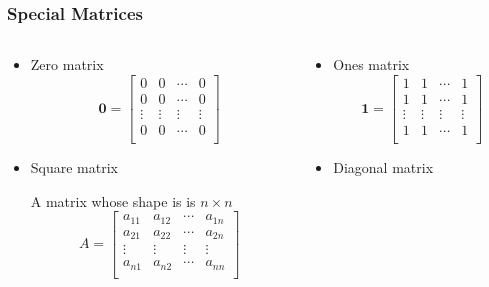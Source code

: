 \documentclass{beamer}
\begin{document}
\begin{frame}
  \frametitle{Special Matrices}

\begin{columns}
\begin{column}{5.25cm}

\begin{itemize}

\item Zero matrix
\[
\mathbf{0} = \left[ \begin{array}{cccc}

0 & 0 & \cdots & 0 \\
0 & 0 & \cdots & 0 \\
\vdots & \vdots & \vdots & \vdots \\
0 & 0 & \cdots & 0 \\

\end{array}
\right]
\]

\item Square matrix

\footnotesize{A matrix whose shape is is $n \times n$}
\[
A = \left[ \begin{array}{cccc}

a_{11} & a_{12} & \cdots & a_{1n} \\
a_{21} & a_{22} & \cdots & a_{2n} \\
\vdots & \vdots & \vdots & \vdots \\
a_{n1} & a_{n2} & \cdots & a_{nn} \\

\end{array}
\right]
\]
\end{itemize}
\end{column}

\begin{column}{5.25cm}
\begin{itemize}
\item Ones matrix
\[
\mathbf{1} = \left[ \begin{array}{cccc}

1 & 1 & \cdots & 1 \\
1 & 1 & \cdots & 1 \\
\vdots & \vdots & \vdots & \vdots \\
1 & 1 & \cdots & 1 \\

\end{array}
\right]
\]

\item Diagonal matrix


\end{itemize}
\end{column}
\end{columns}
\end{frame}
\end{document}

